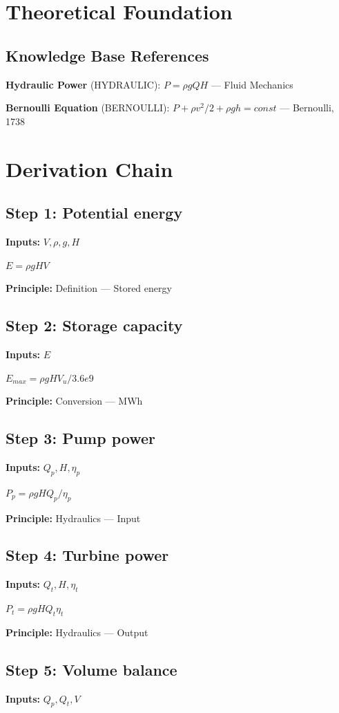 \documentclass[11pt,twocolumn]{article}
\begin{document}
\section{Theoretical Foundation}

\subsection{Knowledge Base References}
\textbf{Hydraulic Power} (HYDRAULIC): $P = \rho g Q H$ --- Fluid Mechanics

\textbf{Bernoulli Equation} (BERNOULLI): $P + \rho v^2/2 + \rho gh = const$ --- Bernoulli, 1738


\section{Derivation Chain}

\subsection*{Step 1: Potential energy}
\textbf{Inputs:} $V, \rho, g, H$

$E = \rho g H V$

\textbf{Principle:} Definition --- Stored energy

\subsection*{Step 2: Storage capacity}
\textbf{Inputs:} $E$

$E_{max} = \rho g H V_u / 3.6e9$

\textbf{Principle:} Conversion --- MWh

\subsection*{Step 3: Pump power}
\textbf{Inputs:} $Q_p, H, \eta_p$

$P_p = \rho g H Q_p / \eta_p$

\textbf{Principle:} Hydraulics --- Input

\subsection*{Step 4: Turbine power}
\textbf{Inputs:} $Q_t, H, \eta_t$

$P_t = \rho g H Q_t \eta_t$

\textbf{Principle:} Hydraulics --- Output

\subsection*{Step 5: Volume balance}
\textbf{Inputs:} $Q_p, Q_t, V$
\end{document}
